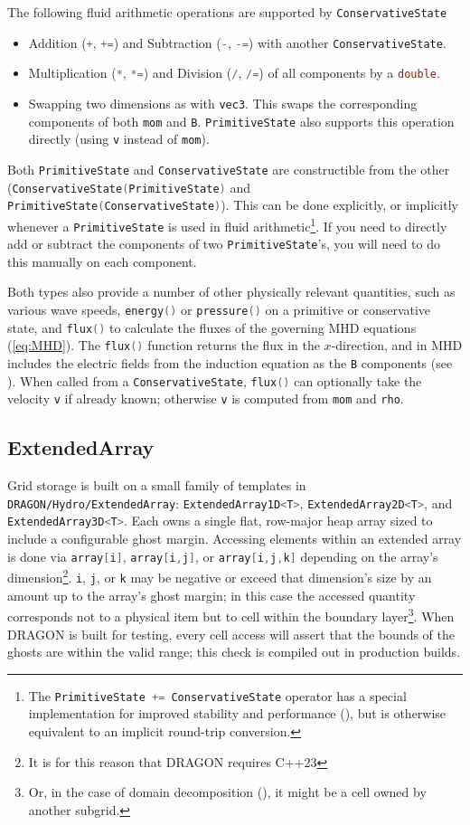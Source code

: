 \documentclass[11pt]{report}
\newcommand{\cpp}[1]{\lstinline[language=C++]{#1}}
\newcommand{\bash}[1]{\lstinline[language=bash]{#1}}
\begin{document}
The following fluid arithmetic operations are supported by \cpp{ConservativeState}
\begin{itemize}
\item Addition (\cpp{+}, \cpp{+=}) and Subtraction  (\cpp{-}, \cpp{-=}) with another \cpp{ConservativeState}.
\item Multiplication (\cpp{*}, \cpp{*=}) and Division  (\cpp{/}, \cpp{/=}) of all components by a \cpp{double}.
\item Swapping two dimensions as with \cpp{vec3}. This swaps the corresponding components of both \cpp{mom} and \cpp{B}. \cpp{PrimitiveState} also supports this operation directly (using \cpp{v} instead of \cpp{mom}).
\end{itemize}

Both \cpp{PrimitiveState} and \cpp{ConservativeState} are constructible from the other (\cpp{ConservativeState(PrimitiveState)} and \cpp{PrimitiveState(ConservativeState)}).  This can be done explicitly, or implicitly whenever a \cpp{PrimitiveState} is used in fluid arithmetic\footnote{The \cpp{PrimitiveState += ConservativeState} operator has a special implementation for improved stability and performance (), but is otherwise equivalent to an implicit round-trip conversion.}. If you need to directly add or subtract the components of two \cpp{PrimitiveState}'s, you will need to do this manually on each component.


Both types also provide a number of other physically relevant quantities, such as various wave speeds, \cpp{energy()} or \cpp{pressure()} on a primitive or conservative state, and \cpp{flux()} to calculate the fluxes of the governing MHD equations (\ref{eq:MHD}). The \cpp{flux()} function returns the flux in the $x$-direction, and in MHD includes the electric fields from the induction equation as the \cpp{B} components (see ).  When called from a \cpp{ConservativeState}, \cpp{flux()} can optionally take the velocity \cpp{v} if already known; otherwise \cpp{v} is computed from \cpp{mom} and \cpp{rho}.


\subsection{ExtendedArray}
\label{sec:extendedarray}
Grid storage is built on a small family of templates in \bash{DRAGON/Hydro/ExtendedArray}: \cpp{ExtendedArray1D<T>}, \cpp{ExtendedArray2D<T>}, and \cpp{ExtendedArray3D<T>}. Each owns a single flat, row-major heap array sized to include a configurable ghost margin.
Accessing elements within an extended array is done via \cpp{array[i]}, \cpp{array[i,j]}, or \cpp{array[i,j,k]} depending on the array's dimension\footnote{It is for this reason that DRAGON requires C++23}. 
\cpp{i}, \cpp{j}, or \cpp{k} may be negative or exceed that dimension's size by an amount up to the array's ghost margin; in this case the accessed quantity corresponds not to a physical item but to cell within the boundary layer\footnote{Or, in the case of domain decomposition (), it might be a cell owned by another subgrid.}.
When DRAGON is built for testing, every cell access will assert that the bounds of the ghosts are within the valid range; this check is compiled out in production builds.
\end{document}
